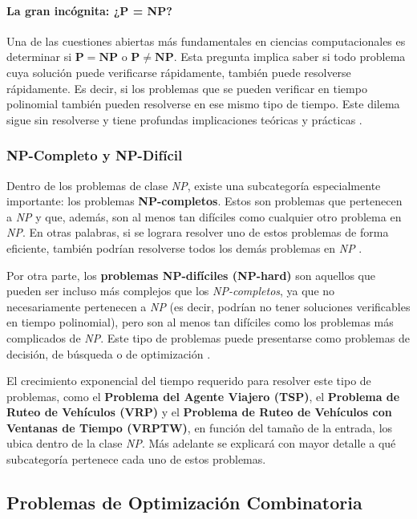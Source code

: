 \documentclass[12pt,titlepage,twoside,openright]{book}
\begin{document}
\paragraph{La gran incógnita: ¿P = NP?}

Una de las cuestiones abiertas más fundamentales en ciencias computacionales es determinar si \(\mathbf{P = NP}\) o \(\mathbf{P \neq NP}\). Esta pregunta implica saber si todo problema cuya solución puede verificarse rápidamente, también puede resolverse rápidamente. Es decir, si los problemas que se pueden verificar en tiempo polinomial también pueden resolverse en ese mismo tipo de tiempo. Este dilema sigue sin resolverse y tiene profundas implicaciones teóricas y prácticas \citep{maldonado2013problema}.

\subsubsection{NP-Completo y NP-Difícil}

Dentro de los problemas de clase \emph{NP}, existe una subcategoría especialmente importante: los problemas \textbf{NP-completos}. Estos son problemas que pertenecen a \emph{NP} y que, además, son al menos tan difíciles como cualquier otro problema en \emph{NP}. En otras palabras, si se lograra resolver uno de estos problemas de forma eficiente, también podrían resolverse todos los demás problemas en \emph{NP} \citep{maldonado2013problema}.

Por otra parte, los \textbf{problemas NP-difíciles (NP-hard)} son aquellos que pueden ser incluso más complejos que los \emph{NP-completos}, ya que no necesariamente pertenecen a \emph{NP} (es decir, podrían no tener soluciones verificables en tiempo polinomial), pero son al menos tan difíciles como los problemas más complicados de \emph{NP}. Este tipo de problemas puede presentarse como problemas de decisión, de búsqueda o de optimización \citep{maldonado2013problema}.

El crecimiento exponencial del tiempo requerido para resolver este tipo de problemas, como el \textbf{Problema del Agente Viajero (TSP)}, el \textbf{Problema de Ruteo de Vehículos (VRP)} y el \textbf{Problema de Ruteo de Vehículos con Ventanas de Tiempo (VRPTW)}, en función del tamaño de la entrada, los ubica dentro de la clase \emph{NP}. Más adelante se explicará con mayor detalle a qué subcategoría pertenece cada uno de estos problemas.

\subsection{Problemas de Optimización Combinatoria}
\end{document}
